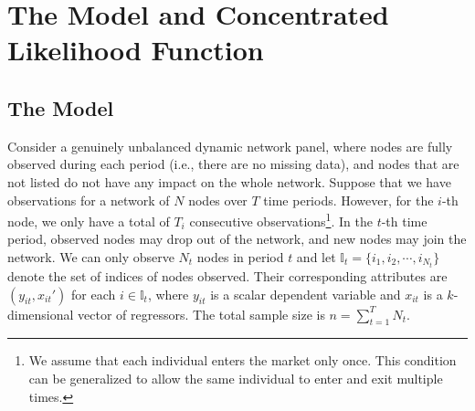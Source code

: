 \documentclass[11pt,a4paper]{article}
\begin{document}
\section{The Model and Concentrated Likelihood Function}\label{section2}
\subsection{The Model}
Consider a genuinely unbalanced dynamic network panel, where nodes are fully observed during each period (i.e., there are no missing data), and nodes that are not listed do not have any impact on the whole network.
Suppose that we have observations for a network of $N$ nodes over $T$ time periods. 
However, for the $i$-th node, we only have a total of $T_i$ consecutive observations\footnote{
We assume that each individual enters the market only once. This condition can be generalized to allow the same individual to enter and exit multiple times.}. %
In the $t$-th time period, observed nodes may drop out of the network, and new nodes may join the network. We can only observe $N_t$ nodes in period $t$ and let $\mathbb{I}_t = \{i_1, i_2, \cdots, i_{N_t}\}$ denote the set of indices of nodes observed. Their corresponding attributes are $(y_{it},x_{it}')$ for each $i\in\mathbb{I}_t$, where $y_{it}$ is a scalar dependent variable and $x_{it}$ is a $k$-dimensional vector of regressors. The total sample size is $n=\sum_{t=1}^{T}N_t$.


\end{document}
